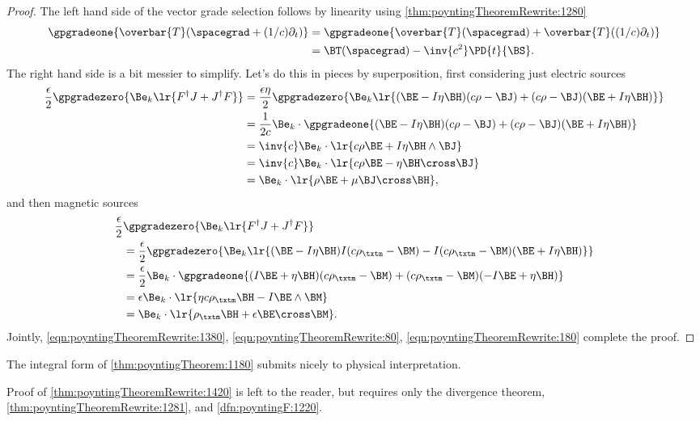 \begin{proof}
The left hand side of the vector grade selection follows by linearity using \cref{thm:poyntingTheoremRewrite:1280}
\begin{equation}\label{eqn:poyntingTheoremRewrite:1380}
\begin{aligned}
\gpgradeone{ \overbar{T}(\spacegrad + (1/c)\partial_t) }
&= \gpgradeone{ \overbar{T}(\spacegrad) + \overbar{T}((1/c)\partial_t) } \\
&= \BT(\spacegrad) - \inv{c^2} \PD{t}{\BS}.
\end{aligned}
\end{equation}
The right hand side is a bit messier to simplify.
Let's do this in pieces by superposition, first considering just electric sources
\begin{equation}\label{eqn:poyntingTheoremRewrite:80}
\begin{aligned}
\frac{\epsilon}{2} \gpgradezero{ \Be_k \lr{ F^\dagger J + J^\dagger F} }
&= \frac{\epsilon \eta}{2} \gpgradezero{ \Be_k \lr{ (\BE - I \eta \BH)(c \rho - \BJ)  + (c \rho - \BJ)( \BE + I \eta \BH )} } \\
&= \frac{1}{2c } \Be_k \cdot \gpgradeone{ (\BE - I \eta \BH)(c \rho - \BJ)  + (c \rho - \BJ)( \BE + I \eta \BH ) } \\
&= \inv{c} \Be_k \cdot \lr{ c \rho \BE + I \eta \BH \wedge \BJ } \\
&= \inv{c} \Be_k \cdot \lr{ c \rho \BE - \eta \BH \cross \BJ } \\
&= \Be_k \cdot \lr{ \rho \BE + \mu \BJ \cross \BH },
\end{aligned}
\end{equation}
and then magnetic sources
\begin{equation}\label{eqn:poyntingTheoremRewrite:180}
\begin{aligned}
\frac{\epsilon}{2 } &\gpgradezero{ \Be_k \lr{ F^\dagger J + J^\dagger F} } \\
&= \frac{\epsilon }{2} \gpgradezero{ \Be_k \lr{ (\BE - I \eta \BH) I (c \rho_\txtm - \BM)  - I (c \rho_\txtm - \BM)( \BE + I \eta \BH )} } \\
&= \frac{\epsilon }{2} \Be_k \cdot \gpgradeone{ (I \BE + \eta \BH)(c \rho_\txtm - \BM)  + (c \rho_\txtm - \BM)( -I \BE + \eta \BH )} \\
&= \epsilon \Be_k \cdot \lr{ \eta c \rho_\txtm \BH - I \BE \wedge \BM } \\
&= \Be_k \cdot \lr{ \rho_\txtm \BH + \epsilon \BE \cross \BM }.
\end{aligned}
\end{equation}
Jointly,
\cref{eqn:poyntingTheoremRewrite:1380}, \cref{eqn:poyntingTheoremRewrite:80}, \cref{eqn:poyntingTheoremRewrite:180} complete the proof.
\end{proof}
The integral form of \cref{thm:poyntingTheorem:1180} submits nicely to physical interpretation.

Proof of
\cref{thm:poyntingTheoremRewrite:1420}
is left to the reader, but
requires only the divergence theorem, \cref{thm:poyntingTheoremRewrite:1281}, and
\cref{dfn:poyntingF:1220}.

